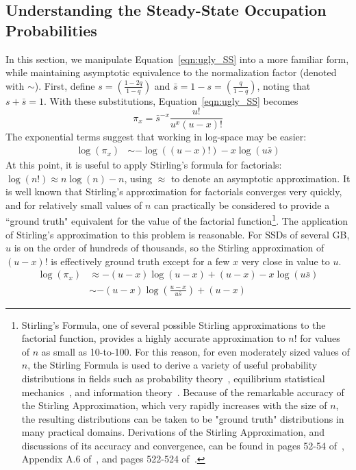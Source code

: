 \documentclass[prodmode,acmtos]{acmsmall}
\begin{document}
\subsection{Understanding the Steady-State Occupation Probabilities}
In this section, we manipulate Equation~\ref{eqn:ugly_SS} into a more familiar form, while maintaining asymptotic equivalence to the normalization factor (denoted with $\sim$).  First, define $s = \left( \frac{1 - 2q}{1 - q} \right)$ and $\bar s = 1 - s = \left( \frac{q}{1 - q} \right)$, noting that $s+\bar{s}=1$.  With these substitutions, Equation~\ref{eqn:ugly_SS} becomes
\begin{equation*}
\pi _x = \bar s^{-x}\frac{u!}{u^x\left( {u - x} \right)!}
\end{equation*}
The exponential terms suggest that working in log-space may be easier:
\begin{align*}\label{}
\log \left( {{\pi _x}} \right) &\sim  - \log \left( {\left( {u - x} \right)!} \right) - x\log \left( {u\bar s} \right)
\end{align*}
At this point, it is useful to apply Stirling's formula for factorials: $\log \left( {n!} \right)\approx n\log \left( n \right) - n$, using $\approx$ to denote an asymptotic approximation. It is well known that Stirling's approximation for factorials converges very quickly, and for relatively small values of $n$ can practically be considered to provide a ``ground truth" equivalent for the value of the factorial function\footnote{Stirling's Formula, one of several possible Stirling approximations to the factorial function, provides a highly accurate approximation to $n!$ for values of $n$ as small as 10-to-100.  For this reason, for even moderately sized values of $n$, the Stirling Formula is used to derive a variety of useful probability distributions in fields such as probability theory~\cite{feller1968}, equilibrium statistical mechanics~\cite{reif1965}, and information theory~\cite{cover2006elements}.  Because of the remarkable accuracy of the Stirling Approximation, which very rapidly increases with the size of $n$, the resulting distributions can be taken to be "ground truth" distributions in many practical domains.  Derivations of the Stirling Approximation, and discussions of its accuracy and convergence, can be found in pages 52-54 of~\cite{feller1968}, Appendix A.6 of~\cite{reif1965}, and pages 522-524 of~\cite{courant1953}.}.  The application of Stirling's approximation to this problem is reasonable.  For SSDs of several GB, $u$ is on the order of hundreds of thousands, so the Stirling approximation of $(u-x)!$ is effectively ground truth except for a few $x$ very close in value to $u$.
\begin{align}
 \log \left( {{\pi _x}} \right) &\approx  - \left( {u - x} \right)\log \left( {u - x} \right) + \left( {u - x} \right) - x\log \left( {u\bar s} \right)\nonumber\\
 &\sim  - \left( {u - x} \right)\log \left( {\frac{{u - x}}{{u\bar s}}} \right) + \left( {u - x} \right)\label{eqn:Stirling_approx}
\end{align}
\end{document}
